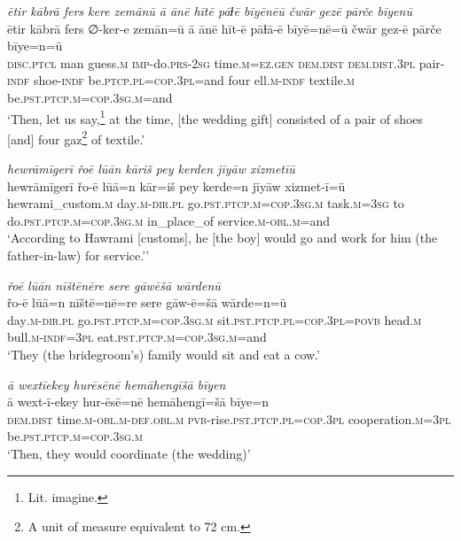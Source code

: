 \ea \label{RE.11}
\textit{ētir kābrā fers kere zemānū ā ānē hītē pāɫē bīyēnēū čwār gezē pārče bīyenū} \\ 
\gll ētir kābrā fers ∅-ker-e zemān=ū ā ānē hīt-ē pāɫā-ē bīyē=nē=ū čwār gez-ē pārče bīye=n=ū \\ 
 \textsc{disc.ptcl} man guess\textsc{.m} \textsc{imp-}do\textsc{.prs}-\textsc{2sg} time\textsc{.m}\textsc{=ez.gen} \textsc{dem.dist} \textsc{dem.dist}\textsc{.3pl} pair\textsc{-indf} shoe\textsc{-indf} be\textsc{.ptcp}\textsc{.pl}\textsc{=cop}\textsc{.3pl}=and four ell\textsc{.m}\textsc{-indf} textile\textsc{.m} be\textsc{.pst}\textsc{.ptcp}\textsc{.m}\textsc{=cop}\textsc{.3sg}\textsc{.m}=and \\ 
\glt `Then, let us say,\footnote{Lit. imagine.} at the time, [the wedding gift] consisted of a pair of shoes [and] four gaz\footnote{A unit of measure equivalent to 72 cm.} of textile.'
\z 
 
\ea \label{RE.12}
\textit{hewrāmīgerī řoē lūān kāriš pey kerden jīyāw xizmetīū} \\ 
\gll hewrāmīgerī řo-ē lūā=n kār=iš pey kerde=n jīyāw xizmet-ī=ū \\ 
 hewrami\_custom\textsc{.m} day\textsc{.m}\textsc{-dir}\textsc{.pl} go\textsc{.pst}\textsc{.ptcp}\textsc{.m}\textsc{=cop}\textsc{.3sg}\textsc{.m} task\textsc{.m}\textsc{=3sg} to do\textsc{.pst}\textsc{.ptcp}\textsc{.m}\textsc{=cop}\textsc{.3sg}\textsc{.m} in\_place\_of service\textsc{.m}\textsc{-obl}\textsc{.m}=and \\ 
\glt `According to Hawrami [customs], he [the boy] would go and work for him (the father-in-law) for service.’'
\z 
 
\ea \label{RE.13}
\textit{řoē lūān nīštēnēre sere gāwēšā wārdenū} \\ 
\gll řo-ē lūā=n nīštē=nē=re sere gāw-ē=šā wārde=n=ū \\ 
 day\textsc{.m}\textsc{-dir}\textsc{.pl} go\textsc{.pst}\textsc{.ptcp}\textsc{.m}\textsc{=cop}\textsc{.3sg}\textsc{.m} sit\textsc{.pst}\textsc{.ptcp}\textsc{.pl}\textsc{=cop}\textsc{.3pl}\textsc{=\textsc{povb}} head\textsc{.m} bull\textsc{.m}\textsc{-indf}\textsc{=3pl} eat\textsc{.pst}\textsc{.ptcp}\textsc{.m}\textsc{=cop}\textsc{.3sg}\textsc{.m}=and \\ 
\glt `They (the bridegroom’s) family would sit and eat a cow.'
\z 
 
\ea \label{RE.14}
\textit{ā wextīekey hurēsēnē hemāhengīšā bīyen} \\ 
\gll ā wext-ī-ekey hur-ēsē=nē hemāhengī=šā bīye=n \\ 
 \textsc{dem.dist} time\textsc{.m}\textsc{-obl}\textsc{.m}\textsc{-def}\textsc{.obl}\textsc{.m} \textsc{pvb-}rise\textsc{.pst}\textsc{.ptcp}\textsc{.pl}\textsc{=cop}\textsc{.3pl} cooperation\textsc{.m}\textsc{=3pl} be\textsc{.pst}\textsc{.ptcp}\textsc{.m}\textsc{=cop}\textsc{.3sg}\textsc{.m} \\ 
\glt `Then, they would coordinate (the wedding)'
\z 
 
